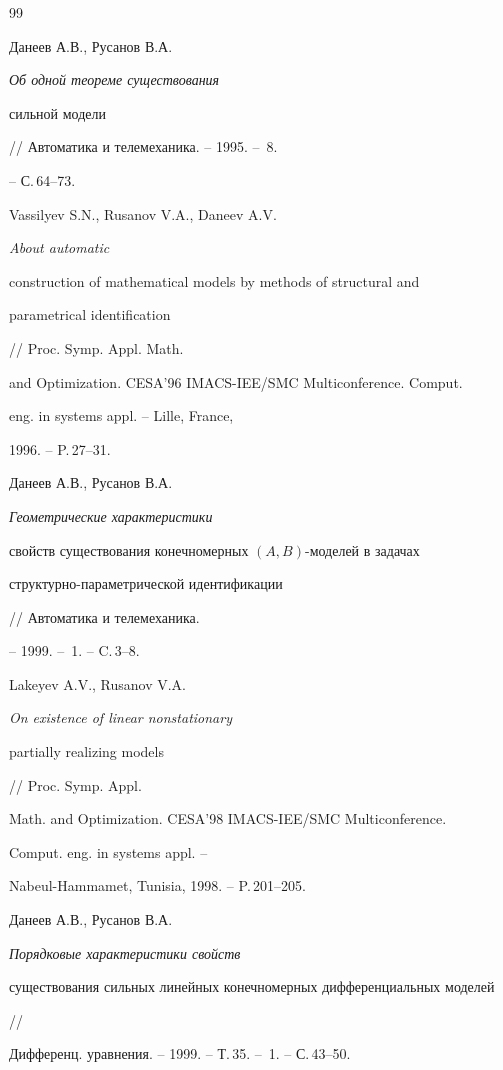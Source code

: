 \begin{thebibliography}{99} 


 




Данеев А.В., Русанов В.А. {\em Об одной теореме существования 


сильной модели} // Автоматика и телемеханика. -- 1995. -- \No\,8. 


-- С.\,64--73. 




Vassilyev S.N., Rusanov V.A., Daneev A.V. {\em About automatic 


construction of mathematical models by methods of structural and 


parametrical identification} // Proc. Symp. Appl. Math. 


and Optimization. CESA'96 IMACS-IEE/SMC Multiconference. Comput.


eng. in systems appl. -- Lille, France, 


1996. -- P.\,27--31. 




Данеев А.В., Русанов В.А. {\em Геометрические характеристики 


свойств существования конечномерных $(A,B)$-моделей в задачах 


структурно-параметрической идентификации} // Автоматика и телемеханика. 


-- 1999. -- \No\,1. -- C.\,3--8. 




Lakeyev A.V., Rusanov V.A. {\em On existence of linear nonstationary 


partially realizing models} // Proc. Symp. Appl. 


Math. and Optimization. CESA'98 IMACS-IEE/SMC Multiconference. 


Comput. eng. in systems appl. -- 


Nabeul-Hammamet, Tunisia, 1998. -- P.\,201--205. 




Данеев А.В., Русанов В.А. {\em Порядковые характеристики свойств 


существования сильных линейных конечномерных дифференциальных моделей} 


// 


Дифференц. уравнения. -- 1999. -- Т.\,35. -- \No\,1. -- С.\,43--50. 





\end{thebibliography}
